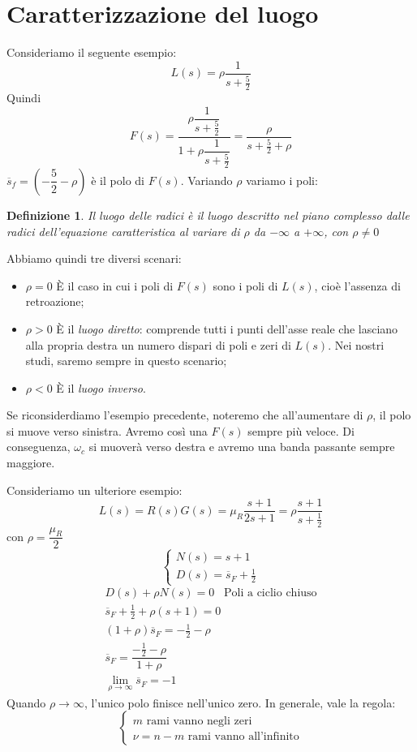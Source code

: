 \documentclass[a4paper]{report}
\newtheorem{definizione}{Definizione}
\begin{document}
\section{Caratterizzazione del luogo}
Consideriamo il seguente esempio:
\[
L(s) = \rho \dfrac{1}{s + \frac{5}{2}}
\]
Quindi
\[
F(s) = \dfrac{\rho \dfrac{1}{s + \frac{5}{2}}}{1 + \rho \dfrac{1}{s +
    \frac{5}{2}}} = \dfrac{\rho}{s + \frac{5}{2} + \rho}
\]
$\overline{s}_f = \left(- \dfrac{5}{2} - \rho \right)$ \`e il polo di $F(s)$.
Variando $\rho$ variamo i poli:
\begin{definizione}
  Il luogo delle radici \`e il luogo descritto nel piano complesso
  dalle radici dell'equazione caratteristica al variare di $\rho$ da
  $- \infty$ a $+ \infty$, con $\rho \neq 0$
\end{definizione}
Abbiamo quindi tre diversi scenari:
\begin{itemize}
\item $\rho = 0$ \`E il caso in cui i poli di $F(s)$ sono i poli di
  $L(s)$, cio\`e l'assenza di retroazione;
\item $\rho > 0$ \`E il {\em luogo diretto}:
  comprende tutti i punti dell'asse reale che lasciano alla propria
  destra un numero dispari di poli e zeri di $L(s)$. Nei nostri studi,
  saremo sempre in questo scenario;
\item $\rho < 0$ \`E il {\em luogo inverso}.
\end{itemize}
Se riconsiderdiamo l'esempio precedente, noteremo che all'aumentare di
$\rho$, il polo si muove verso sinistra. Avremo cos\`i una $F(s)$
sempre pi\`u veloce. Di conseguenza, $\omega_c$ si muover\`a verso
destra e avremo una banda passante sempre maggiore.

Consideriamo un ulteriore esempio:
\[
L(s) = R(s)G(s) = \mu_R \dfrac{s + 1}{2s + 1} = \rho \dfrac{s + 1}{s + \frac{1}{2}}
\]
con $\rho = \dfrac{\mu_R}{2}$
\[
\left\{
\begin{array}{l}
  N(s) = s + 1\\
  D(s) = \overline{s}_F + \frac{1}{2}
\end{array}
\right .
\]
\[
\begin{array}{l}
  D(s) + \rho N(s) = 0 \;\;\;\textrm{Poli a ciclio chiuso}\\
  \overline{s}_F + \frac{1}{2} + \rho (s + 1) = 0\\
  (1 + \rho) \overline{s}_F = - \frac{1}{2} - \rho\\
  \overline{s}_F = \dfrac{- \frac{1}{2} - \rho}{1 + \rho}\\
  \lim_{\rho \to \infty} \overline{s}_F = -1
\end{array}
\]
Quando $\rho \to \infty$, l'unico polo finisce nell'unico zero. In
generale, vale la regola:
\[
\left\{
\begin{array}{l}
  m \textrm{ rami vanno negli zeri}\\
  \nu = n - m \textrm{ rami vanno all'infinito}
\end{array}
\right .
\]
\end{document}
